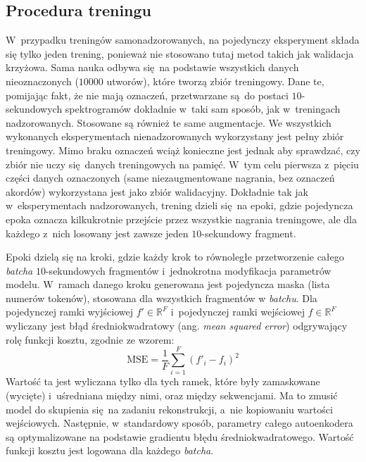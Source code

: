 \subsection{Procedura treningu}

W~przypadku treningów samonadzorowanych, na pojedynczy eksperyment składa się tylko jeden trening, ponieważ nie stosowano tutaj metod takich jak walidacja krzyżowa. Sama nauka odbywa się na podstawie wszystkich danych nieoznaczonych ($10000$ utworów), które tworzą zbiór treningowy. Dane te, pomijając fakt, że nie mają oznaczeń, przetwarzane są do postaci $10$-sekundowych spektrogramów dokładnie w~taki sam sposób, jak w~treningach nadzorowanych. Stosowane są również te same augmentacje. We wszystkich wykonanych eksperymentach nienadzorowanych wykorzystany jest pełny zbiór treningowy. Mimo braku oznaczeń wciąż konieczne jest jednak aby sprawdzać, czy zbiór nie uczy się danych treningowych na pamięć. W~tym celu pierwsza z~pięciu części danych oznaczonych (same niezaugmentowane nagrania, bez oznaczeń akordów) wykorzystana jest jako zbiór walidacyjny. Dokładnie tak jak w~eksperymentach nadzorowanych, trening dzieli się na epoki, gdzie pojedyncza epoka oznacza kilkukrotnie przejście przez wszystkie nagrania treningowe, ale dla każdego z~nich losowany jest zawsze jeden $10$-sekundowy fragment.

Epoki dzielą się na kroki, gdzie każdy krok to równoległe przetworzenie całego \emph{batcha} $10$-sekundowych fragmentów i~jednokrotna modyfikacja parametrów modelu. W~ramach danego kroku generowana jest pojedyncza maska (lista numerów tokenów), stosowana dla wszystkich fragmentów w \emph{batchu}. Dla pojedynczej ramki wyjściowej $f' \in \mathbb{R}^F$ i~pojedynczej ramki wejściowej $f \in \mathbb{R}^F$ wyliczany jest błąd średniokwadratowy (ang. \emph{mean squared error}) odgrywający rolę funkcji kosztu, zgodnie ze wzorem:
\begin{equation}
    \textrm{MSE} = \frac{1}{F} \sum_{i=1}^{F} (f'_{i} - f_{i})^2
\end{equation}
Wartość ta jest wyliczana tylko dla tych ramek, które były zamaskowane (wycięte) i~uśredniana między nimi, oraz między sekwencjami. Ma to zmusić model do skupienia się na zadaniu rekonstrukcji, a~nie kopiowaniu wartości wejściowych.  Następnie, w~standardowy sposób, parametry całego autoenkodera są optymalizowane na podstawie gradientu błędu średniokwadratowego.  Wartość funkcji kosztu jest logowana dla każdego \emph{batcha}.

